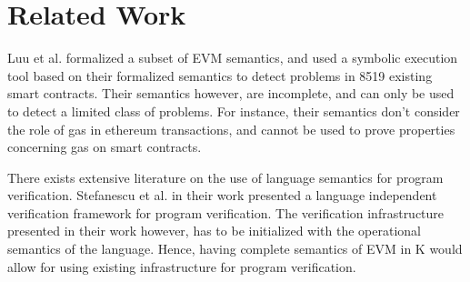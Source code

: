 \section{Related Work}
Luu et al.\cite{luumaking} formalized a subset of EVM semantics, and used a symbolic execution tool based on their formalized semantics to detect problems in 8519 existing smart contracts. Their semantics however, are incomplete, and can only be used to detect a limited class of problems. For instance, their semantics don't consider the role of  gas in ethereum transactions, and cannot be used to prove properties concerning gas on smart contracts. 

There exists extensive literature on the use of language semantics for program verification. Stefanescu et al. \cite{stefanescu-park-yuwen-li-rosu-2016-oopsla} in their work presented a language independent verification framework for program verification. The verification infrastructure presented in their work however, has to be initialized with the operational semantics of the language. Hence, having complete semantics of EVM in K would allow for using existing infrastructure for program verification.
